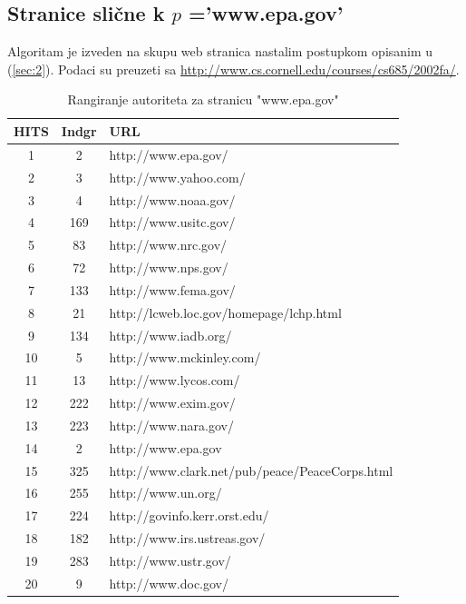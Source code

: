\documentclass[11pt]{article}
\begin{document}
\subsection{Stranice slične k $p$ ='www.epa.gov'}
Algoritam je izveden na skupu web stranica nastalim postupkom opisanim u (\ref{sec:2}). Podaci su preuzeti sa \url{http://www.cs.cornell.edu/courses/cs685/2002fa/}.
\newpage
\begin{table} [h!]
\begin{tabular}{c|c|l}
HITS&Indgr&URL\\
\hline
1 & 2 &  http://www.epa.gov/\\
2 & 3 & http://www.yahoo.com/\\
3 & 4 & http://www.noaa.gov/\\
4 & 169 & http://www.usitc.gov/\\
5 & 83 & http://www.nrc.gov/\\
6 & 72 & http://www.nps.gov/\\
7 & 133 & http://www.fema.gov/\\
8 & 21 & http://lcweb.loc.gov/homepage/lchp.html\\
9 & 134 & http://www.iadb.org/\\
10 & 5 & http://www.mckinley.com/\\
11 & 13 & http://www.lycos.com/\\
12 & 222 & http://www.exim.gov/\\
13 & 223 & http://www.nara.gov/\\
14 & 2 & http://www.epa.gov\\
15 & 325 & http://www.clark.net/pub/peace/PeaceCorps.html\\
16 & 255 & http://www.un.org/\\
17 & 224 & http://govinfo.kerr.orst.edu/\\
18 & 182 & http://www.irs.ustreas.gov/\\
19 & 283 & http://www.ustr.gov/\\
20 & 9 & http://www.doc.gov/
\end{tabular}
\caption{Rangiranje autoriteta za stranicu "www.epa.gov"}
\end{table}
\newpage
\end{document}
